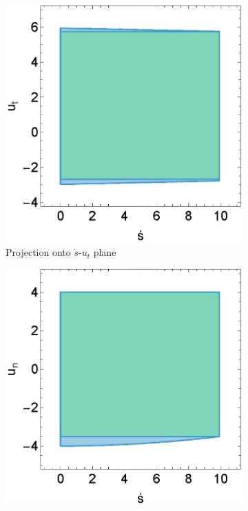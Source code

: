 \begin{figure}[ht]
	\centering
	\begin{subfigure}[b]{0.32\textwidth}
		\centering
		\includegraphics[width=\textwidth]{figures/inner_polytope/region_x3u1_plot_gr1.eps}
		\caption{Projection onto $\dot{s}$-$u_t$ plane}
	\end{subfigure}
	\begin{subfigure}[b]{0.32\textwidth}
		\centering
		\includegraphics[width=\textwidth]{figures/inner_polytope/region_x3u2_plot_gr1.eps}

\end{subfigure}
\end{figure}
